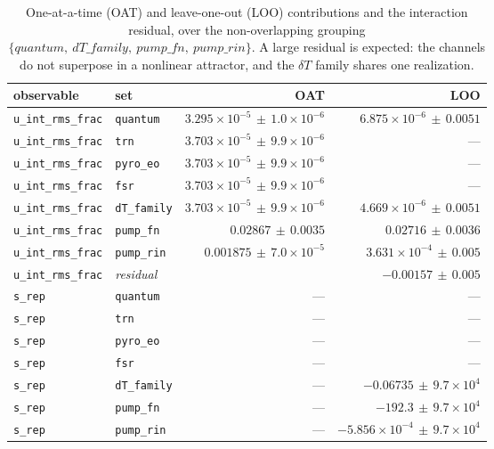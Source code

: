 \begin{table}[t]
  \centering
  \caption{One-at-a-time (OAT) and leave-one-out (LOO) contributions and the interaction residual, over the non-overlapping grouping $\{quantum,\ dT\_family,\ pump\_fn,\ pump\_rin\}$. A large residual is expected: the channels do not superpose in a nonlinear attractor, and the $\delta T$ family shares one realization.}
  \label{tab:noise-budget-contributions}
  \begin{tabular}{llrr}
    \toprule
    observable & set & OAT & LOO \\
    \midrule
    \texttt{u\_int\_rms\_frac} & \texttt{quantum} & $3.295\times10^{-5}\,{\pm}\,1.0\times10^{-6}$ & $6.875\times10^{-6}\,{\pm}\,0.0051$ \\
    \texttt{u\_int\_rms\_frac} & \texttt{trn} & $3.703\times10^{-5}\,{\pm}\,9.9\times10^{-6}$ & --- \\
    \texttt{u\_int\_rms\_frac} & \texttt{pyro\_eo} & $3.703\times10^{-5}\,{\pm}\,9.9\times10^{-6}$ & --- \\
    \texttt{u\_int\_rms\_frac} & \texttt{fsr} & $3.703\times10^{-5}\,{\pm}\,9.9\times10^{-6}$ & --- \\
    \texttt{u\_int\_rms\_frac} & \texttt{dT\_family} & $3.703\times10^{-5}\,{\pm}\,9.9\times10^{-6}$ & $4.669\times10^{-6}\,{\pm}\,0.0051$ \\
    \texttt{u\_int\_rms\_frac} & \texttt{pump\_fn} & $0.02867\,{\pm}\,0.0035$ & $0.02716\,{\pm}\,0.0036$ \\
    \texttt{u\_int\_rms\_frac} & \texttt{pump\_rin} & $0.001875\,{\pm}\,7.0\times10^{-5}$ & $3.631\times10^{-4}\,{\pm}\,0.005$ \\
    \texttt{u\_int\_rms\_frac} & \emph{residual} & \multicolumn{2}{r}{$-0.00157\,{\pm}\,0.005$} \\
    \midrule
    \texttt{s\_rep} & \texttt{quantum} & --- & --- \\
    \texttt{s\_rep} & \texttt{trn} & --- & --- \\
    \texttt{s\_rep} & \texttt{pyro\_eo} & --- & --- \\
    \texttt{s\_rep} & \texttt{fsr} & --- & --- \\
    \texttt{s\_rep} & \texttt{dT\_family} & --- & $-0.06735\,{\pm}\,9.7\times10^{4}$ \\
    \texttt{s\_rep} & \texttt{pump\_fn} & --- & $-192.3\,{\pm}\,9.7\times10^{4}$ \\
    \texttt{s\_rep} & \texttt{pump\_rin} & --- & $-5.856\times10^{-4}\,{\pm}\,9.7\times10^{4}$ \\

\end{tabular}
\end{table}
